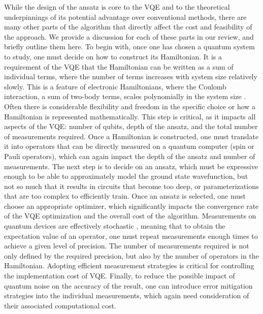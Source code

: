 While the design of the ansatz is core to the VQE and to the theoretical underpinnings of its potential advantage over conventional methods, there are many other parts of the algorithm that directly affect the cost and feasibility of the approach. We provide a discussion for each of these parts in our review, and briefly outline them here. To begin with, once one has chosen a quantum system to study, one must decide on how to construct its Hamiltonian. It is a requirement of the VQE that the Hamiltonian can be written as a sum of individual terms, where the number of terms increases with system size relatively slowly. This is a feature of electronic Hamiltonians, where the Coulomb interaction, a sum of two-body terms, scales polynomially in the system size \cite{Szabo1996}. Often there is considerable flexibility and freedom in the specific choice or how a Hamiltonian is represented mathematically. This step is critical, as it impacts all aspects of the VQE: number of qubits, depth of the ansatz, and the total number of measurements required. Once a Hamiltonian is constructed, one must translate it into operators that can be directly measured on a quantum computer (spin or Pauli operators), which can again impact the depth of the ansatz and number of measurements. The next step is to decide on an ansatz, which must be expressive enough to be able to approximately model the ground state wavefunction, but not so much that it results in circuits that become too deep, or parameterizations that are too complex to efficiently train. Once an ansatz is selected, one must choose an appropriate optimizer, which significantly impacts the convergence rate of the VQE optimization and the overall cost of the algorithm. Measurements on quantum devices are effectively stochastic \cite{nielsenQuantumComputationQuantum2010}, meaning that to obtain the expectation value of an operator, one must repeat measurements enough times to achieve a given level of precision. The number of measurements required is not only defined by the required precision, but also by the number of operators in the Hamiltonian. Adopting efficient measurement strategies is critical for controlling the implementation cost of VQE. Finally, to reduce the possible impact of quantum noise on the accuracy of the result, one can introduce error mitigation strategies into the individual measurements, which again need consideration of their associated computational cost. 

